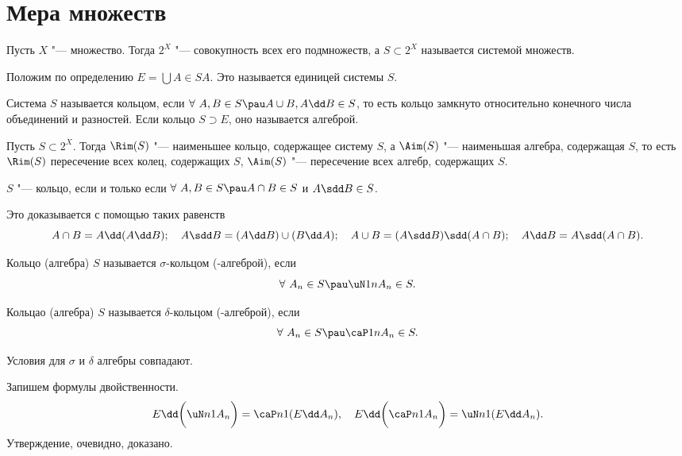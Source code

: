 \section{Мера множеств}
Пусть $X$ "--- множество. Тогда $2^X$ "--- совокупность всех его подмножеств, а $S\subset 2^X$ называется системой множеств.

Положим по определению $E = \bigcup\limits{A\in S}A$. Это называется единицей системы $S$.

\begin{Def}
  Система $S$ называется кольцом, если $\forall\ A,B\in S\pau A\cup B,A\dd B\in S$, то есть кольцо замкнуто относительно конечного числа объединений и разностей. Если кольцо $S\supset E$, оно называется алгеброй.
\end{Def}

Пусть $S\subset 2^X$. Тогда $\Rim(S)$ "--- наименьшее кольцо, содержащее систему $S$, а $\Aim(S)$ "--- наименьшая алгебра, содержащая $S$, то есть $\Rim(S)$ пересечение всех колец, содержащих $S$, $\Aim(S)$ "--- пересечение всех алгебр, содержащих $S$.

\begin{Ut}
  $S$ "--- кольцо, если и только если $\forall\ A,B\in S\pau A\cap B\in S$ и $A\sdd B\in S$.
\end{Ut}

\begin{Proof}
  Это доказывается с помощью таких равенств
\[
  A\cap B = A\dd (A\dd B);\quad A\sdd B = (A\dd B)\cup (B\dd A);\quad
  A\cup B = (A\sdd B)\sdd(A\cap B);\quad A\dd B = A\sdd (A\cap B).
\]
\end{Proof}

\begin{Def}
  Кольцо (алгебра) $S$ называется $\sigma$-кольцом (-алгеброй), если
\[
  \forall\ A_n\in S\pau \uN 1n A_n\in S.
\]
\end{Def}

\begin{Def}
  Кольцао (алгебра) $S$ называется $\delta$-кольцом (-алгеброй), если
\[
  \forall\ A_n\in S\pau \caP 1n A_n\in S.
\]
\end{Def}

\begin{Ut} 
  Условия для $\sigma$ и $\delta$ алгебры совпадают.
\end{Ut}
\begin{Proof}
  Запишем формулы двойственности.
\[
  E\dd \bigg( \uN n1 A_n\bigg) = \caP n1(E\dd A_n),\quad
  E\dd \bigg( \caP n1 A_n\bigg) = \uN n1(E\dd A_n).
\]
Утверждение, очевидно, доказано.
\end{Proof}

